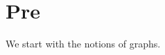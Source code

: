 \vspace{-1ex}
\section{Pre}
\label{sec-pre}

\vspace{-1ex}
We start with the notions of graphs.





